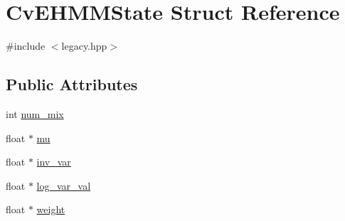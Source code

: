 \hypertarget{structCvEHMMState}{\section{Cv\-E\-H\-M\-M\-State Struct Reference}
\label{structCvEHMMState}
}


{\ttfamily \#include $<$legacy.\-hpp$>$}

\subsection*{Public Attributes}
\begin{DoxyCompactItemize}
\item 
int \hyperlink{structCvEHMMState_adfda6047de059d4f4cad1f8ed2b36a29}{num\-\_\-mix}
\item 
float $\ast$ \hyperlink{structCvEHMMState_a993c9aa34c4de69c40af0c0e6b2d3f2c}{mu}
\item 
float $\ast$ \hyperlink{structCvEHMMState_adcb09e6a57bb8b6c06ced06629ea7fa2}{inv\-\_\-var}
\item 
float $\ast$ \hyperlink{structCvEHMMState_a9cd99f55e789424d88d2283e9ec89daf}{log\-\_\-var\-\_\-val}
\item 
float $\ast$ \hyperlink{structCvEHMMState_a3bb5cefe04096511d309bf6da477dbed}{weight}
\end{DoxyCompactItemize}


